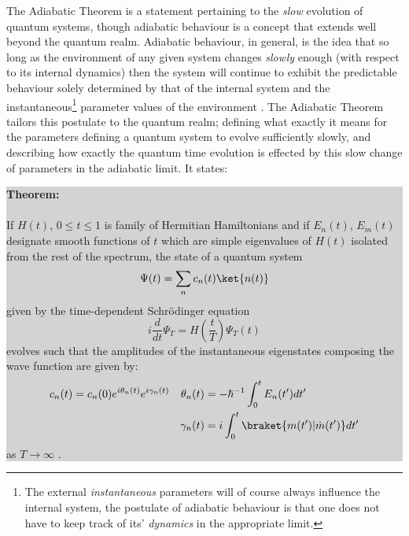 \documentclass{article}
\begin{document}
The Adiabatic Theorem is a statement pertaining to the \textit{slow} evolution of quantum systems, though adiabatic behaviour is a concept that extends well beyond the quantum realm. Adiabatic behaviour, in general, is the idea that so long as the environment of any given system changes \textit{slowly} enough (with respect to its internal dynamics) then the system will continue to exhibit the predictable behaviour solely determined by that of the internal system and the instantaneous\footnote{The external \textit{instantaneous} parameters will of course always influence the internal system, the postulate of adiabatic behaviour is that one does not have to keep track of its' \textit{dynamics} in the appropriate limit.} parameter values of the environment \cite{Griffiths2017}. The Adiabatic Theorem tailors this postulate to the quantum realm; defining what exactly it means for the parameters defining a quantum system to evolve sufficiently slowly, and describing how exactly the quantum time evolution is effected by this slow change of parameters in the adiabatic limit. It states:\\

\colorbox{lightgray}{
\begin{minipage}{0.9\textwidth}
\noindent\textbf{Theorem:}\\
\\
If $H(t)$, $0 \leq t \leq 1$ is  family of Hermitian Hamiltonians and if $E_n(t)$, $E_m(t)$ designate smooth functions of $t$ which are simple eigenvalues of $H(t)$ isolated from the rest of the spectrum, the state of a quantum system \[\Psi(t) = \sum_{n} c_{n}(t)\ket{n(t)}\] given by the time-dependent Schrödinger equation
  \[i\frac{d}{dt}\Psi_{T} = H(\frac{t}{T})\Psi_{T}(t)\]
evolves such that the amplitudes of the instantaneous eigenstates composing the wave function are given by:
    \begin{align*} 
        c_{n}(t) = c_{n}(0)e^{i\theta_{n}(t)}e^{i\gamma_{n}(t)} &&
        \theta_{n}(t)  &= -\hbar^{-1} \int_{0}^{t} E_{n}(t^{\prime}) dt^{\prime}\\  
        && \gamma_{n}(t) &= i\int_{0}^{t} \braket{m(t^{\prime})|\dot{m}(t^{\prime})}
        dt^{\prime}
    \end{align*}
as $T \to \infty$ \cite{Born1928, Berry1984, Simon1983, Sakurai1994}.
\end{minipage}
}



\end{document}

